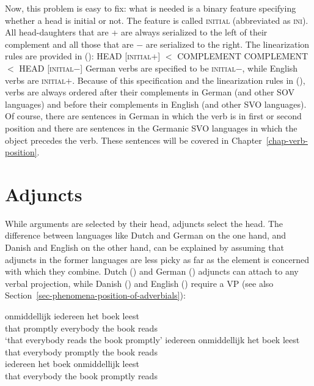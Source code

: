 Now, this problem is easy to fix: what is needed is a binary feature specifying whether a head is
initial or not. The feature is called \textsc{initial} (abbreviated as \textsc{ini}). All
head-daughters that are \ini{}+ are always serialized to the left of their complement and all those
that are \ini{}$-$ are serialized to the right. The linearization rules are provided in ():
\eal
\label{lp-regeln}
\ex HEAD [\textsc{initial}+] $<$ COMPLEMENT
\ex COMPLEMENT $<$  HEAD [\textsc{initial}$-$]
\zl
German verbs are specified to be \textsc{initial}$-$, while English verbs are
\textsc{initial}$+$. Because of this specification and the linearization rules in (), verbs
are always ordered after their complements in German (and other SOV languages) and before their
complements in English (and other SVO languages). Of course, there are sentences in German in which
the verb is in first or second position and there are sentences in the Germanic SVO languages in
which the object precedes the verb. These sentences will be covered in Chapter~\ref{chap-verb-position}.


\section{Adjuncts}
\label{sec-adjuncts}

While arguments are selected by their head, adjuncts select the head. The difference between
languages like Dutch and German on the one hand, and Danish and English on the other hand, can be
explained by assuming that adjuncts in the former languages are less picky as far as the element is
concerned with which they combine. Dutch () and German ()
adjuncts can attach to any verbal projection, while Danish () and English () require a
VP (see also Section~\ref{sec-phenomena-position-of-adverbials}):

\eal
\ex 
\gll [dat] onmiddellijk iedereen het boek leest\\
     \spacebr{}that promptly everybody the book reads\\\dutch
\glt `that everybody reads the book promptly'
\ex
\gll [dat] iedereen onmiddellijk het boek leest\\ 
     \spacebr{}that everybody promptly the book reads\\ 
\ex
\gll [dat] iedereen het boek onmiddellijk leest\\ 
    \spacebr{}that everybody the book promptly reads\\
\zl

